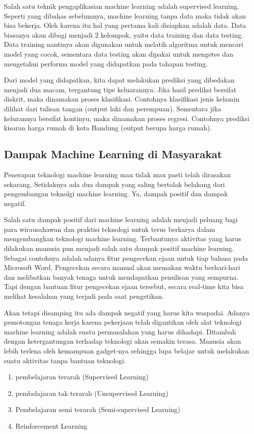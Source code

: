 Salah satu teknik pengaplikasian machine learning adalah supervised learning. Seperti yang dibahas sebelumnya, machine learning tanpa data maka tidak akan bisa bekerja. Oleh karena itu hal yang pertama kali disiapkan adalah data. Data biasanya akan dibagi menjadi 2 kelompok, yaitu data training dan data testing. Data training nantinya akan digunakan untuk melatih algoritma untuk mencari model yang cocok, sementara data testing akan dipakai untuk mengetes dan mengetahui performa model yang didapatkan pada tahapan testing.
\par Dari model yang didapatkan, kita dapat melakukan prediksi yang dibedakan menjadi dua macam, tergantung tipe keluarannya. Jika hasil prediksi bersifat diskrit, maka dinamakan proses klasifikasi. Contohnya klasifikasi jenis kelamin dilihat dari tulisan tangan (output laki dan perempuan). Sementara jika kelurannya bersifat kontinyu, maka dinamakan proses regresi. Contohnya prediksi kisaran harga rumah di kota Bandung (output berupa harga rumah).

\subsection{Dampak Machine Learning di Masyarakat}
Penerapan teknologi machine learning mau tidak mau pasti telah dirasakan sekarang. Setidaknya ada dua dampak yang saling bertolak belakang dari pengembangan teknolgi machine learning. Ya, dampak positif dan dampak negatif.
\par Salah satu dampak positif dari machine learning adalah menjadi peluang bagi para wirausahawan dan praktisi teknologi untuk terus berkarya dalam mengembangkan teknologi machine learning. Terbantunya aktivitas yang harus dilakukan manusia pun menjadi salah satu dampak positif machine learning. Sebagai contohnya adalah adanya fitur pengecekan ejaan untuk tiap bahasa pada Microsoft Word. Pengecekan secara manual akan memakan waktu berhari-hari dan melibatkan banyak tenaga untuk mendapatkan penulisan yang sempurna. Tapi dengan bantuan fitur pengecekan ejaan tersebut, secara real-time kita bisa melihat kesalahan yang terjadi pada saat pengetikan.
\par Akan tetapi disamping itu ada dampak negatif yang harus kita waspadai. Adanya pemotongan tenaga kerja karena pekerjaan telah digantikan oleh alat teknologi machine learning adalah suatu permasalahan yang harus dihadapi. Ditambah dengan ketergantungan terhadap teknologi akan semakin terasa. Manusia akan lebih terlena oleh kemampuan gadget-nya sehingga lupa belajar untuk melakukan suatu aktivitas tanpa bantuan teknologi.




















\begin{enumerate}
	\item pembelajaran terarah (Supervised Learning)
	\item pembelajaran tak terarah (Unsupervised Learning)
	\item Pembelajaran semi terarah (Semi-supervised Learning)
	\item Reinforcement Learning
\end{enumerate}

